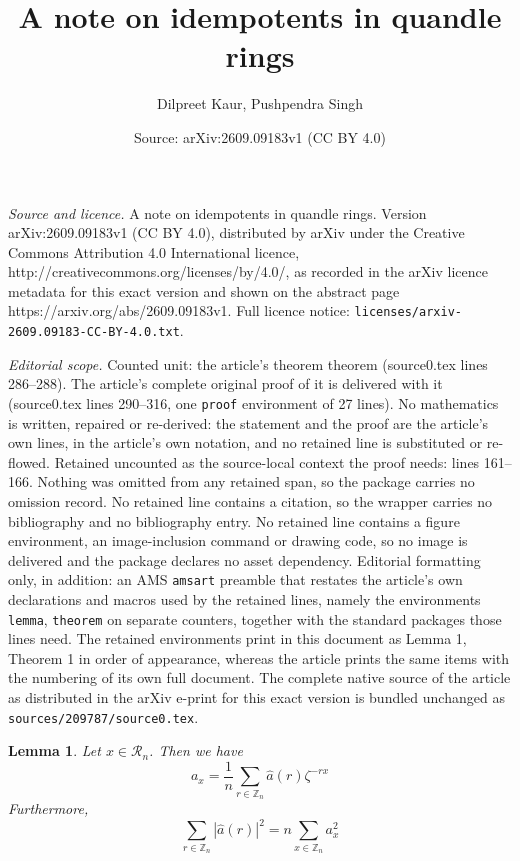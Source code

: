 \documentclass[10pt,a4paper]{amsart}
\title{A note on idempotents in quandle rings}
\author{Dilpreet Kaur, Pushpendra Singh}
\date{Source: arXiv:2609.09183v1 (CC BY 4.0)}
\newtheorem{lemma}{Lemma}
\begin{document}
\maketitle

\noindent\emph{Source and licence.} A note on idempotents in quandle rings. Version arXiv:2609.09183v1 (CC BY 4.0), distributed by arXiv under the Creative Commons Attribution 4.0 International licence, http://creativecommons.org/licenses/by/4.0/, as recorded in the arXiv licence metadata for this exact version and shown on the abstract page https://arxiv.org/abs/2609.09183v1. Full licence notice: \texttt{licenses/arxiv-2609.09183-CC-BY-4.0.txt}.\par\smallskip

\noindent\textit{Editorial scope.} Counted unit: the article's theorem theorem (source0.tex lines 286--288). The article's complete original proof of it is delivered with it (source0.tex lines 290--316, one \texttt{proof} environment of 27 lines). No mathematics is written, repaired or re-derived: the statement and the proof are the article's own lines, in the article's own notation, and no retained line is substituted or re-flowed.  Retained uncounted as the source-local context the proof needs: lines 161--166.  Nothing was omitted from any retained span, so the package carries no omission record.  No retained line contains a citation, so the wrapper carries no bibliography and no bibliography entry.  No retained line contains a figure environment, an image-inclusion command or drawing code, so no image is delivered and the package declares no asset dependency.  Editorial formatting only, in addition: an AMS \texttt{amsart} preamble that restates the article's own declarations and macros used by the retained lines, namely the environments \texttt{lemma}, \texttt{theorem} on separate counters, together with the standard packages those lines need.  The retained environments print in this document as Lemma 1, Theorem 1 in order of appearance, whereas the article prints the same items with the numbering of its own full document.  The complete native source of the article as distributed in the arXiv e-print for this exact version is bundled unchanged as \texttt{sources/209787/source0.tex}.
\begin{lemma}\label{inv}
Let $x\in \mathcal R_n$. Then we have
\[a_x= \frac{1}{n} \sum\limits_{r\in \mathbb Z_n} \hat{a}(r)\zeta^{-rx}\]
Furthermore,
\[ \sum\limits_{r\in \mathbb Z_n} |\hat{a}(r)|^2=n \sum\limits_{x\in \mathbb Z_n} a_x^2 \]
\end{lemma}
\end{document}
